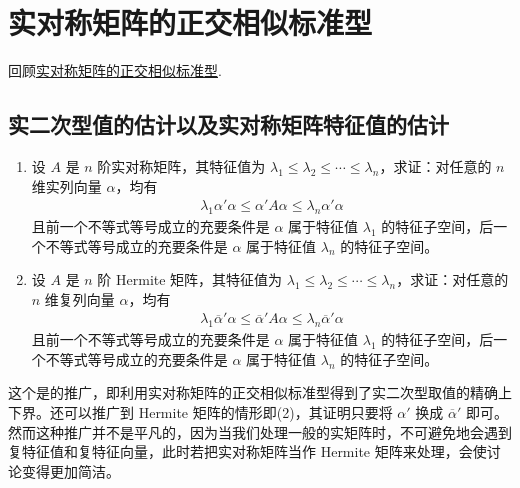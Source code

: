 \documentclass[../../main.tex]{subfiles}
\begin{document}
\section{实对称矩阵的正交相似标准型}

回顾\hyperref[theorem:实对称和Hermite矩阵的正交对角化]{实对称矩阵的正交相似标准型}.

\subsection{实二次型值的估计以及实对称矩阵特征值的估计}

\begin{proposition}\label{proposition:例9.52}
\begin{enumerate}[(1)]
\item 设 \(A\) 是 \(n\) 阶实对称矩阵，其特征值为 \(\lambda_1 \leq \lambda_2 \leq \cdots \leq \lambda_n\)，求证：对任意的 \(n\) 维实列向量 \(\alpha\)，均有
\begin{align*}
\lambda_1\alpha'\alpha \leq \alpha'A\alpha \leq \lambda_n\alpha'\alpha
\end{align*}
且前一个不等式等号成立的充要条件是 \(\alpha\) 属于特征值 \(\lambda_1\) 的特征子空间，后一个不等式等号成立的充要条件是 \(\alpha\) 属于特征值 \(\lambda_n\) 的特征子空间。

\item 设 \(A\) 是 \(n\) 阶 Hermite 矩阵，其特征值为 \(\lambda_1 \leq \lambda_2 \leq \cdots \leq \lambda_n\)，求证：对任意的 \(n\) 维复列向量 \(\alpha\)，均有
\begin{align*}
\lambda_1\overline{\alpha}'\alpha \leq \overline{\alpha}'A\alpha \leq \lambda_n\overline{\alpha}'\alpha
\end{align*}
且前一个不等式等号成立的充要条件是 \(\alpha\) 属于特征值 \(\lambda_1\) 的特征子空间，后一个不等式等号成立的充要条件是 \(\alpha\) 属于特征值 \(\lambda_n\) 的特征子空间。
\end{enumerate}
\end{proposition}
\begin{remark}
这个是的推广，即利用实对称矩阵的正交相似标准型得到了实二次型取值的精确上下界。还可以推广到 Hermite 矩阵的情形即(2)，其证明只要将 \(\alpha'\) 换成 \(\overline{\alpha}'\) 即可。然而这种推广并不是平凡的，因为当我们处理一般的实矩阵时，不可避免地会遇到复特征值和复特征向量，此时若把实对称矩阵当作 Hermite 矩阵来处理，会使讨论变得更加简洁。
\end{remark}
\end{document}
